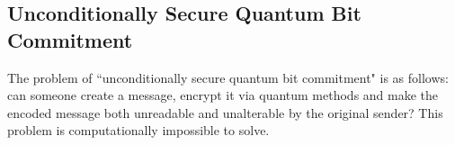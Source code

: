 \documentclass[12pt]{article}
\begin{document}
\begin{flushleft}
\subsection{Unconditionally Secure Quantum Bit Commitment}
The problem of ``unconditionally secure quantum bit commitment" is as follows: can someone create a message, encrypt it via quantum methods and make the encoded message both unreadable and unalterable by the original sender? This problem is computationally impossible to solve.

\newpage



\end{flushleft}
\end{document}
